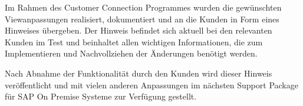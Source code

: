 Im Rahmen des Customer Connection Programmes wurden die gewünschten Viewanpassungen realisiert, dokumentiert und an die Kunden in Form eines Hinweises übergeben. Der Hinweis befindet sich aktuell bei den relevanten Kunden im Test und beinhaltet allen wichtigen Informationen, die zum Implementieren und Nachvollziehen der Änderungen benötigt werden.


Nach Abnahme der Funktionalität durch den Kunden wird dieser Hinweis veröffentlicht und mit vielen anderen Anpassungen im nächsten Support Package für SAP On Premise Systeme zur Verfügung gestellt.

\acresetall
